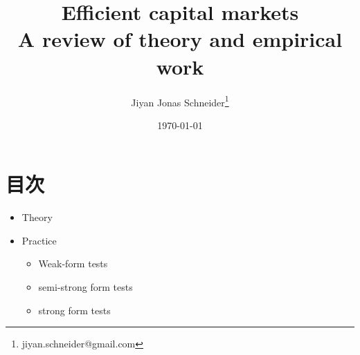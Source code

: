 \documentclass[11pt]{article}
\author{Jiyan Jonas Schneider\thanks{jiyan.schneider@gmail.com}}
\date{\today}
\title{Efficient capital markets\\\medskip
\large A review of theory and empirical work}
\begin{document}
\maketitle
\tableofcontents

\section{目次}
\label{sec:org8f3d386}
\begin{itemize}
\item Theory
\item Practice
\begin{itemize}
\item Weak-form tests
\item semi-strong form tests
\item strong form tests
\end{itemize}
\end{itemize}
\end{document}
